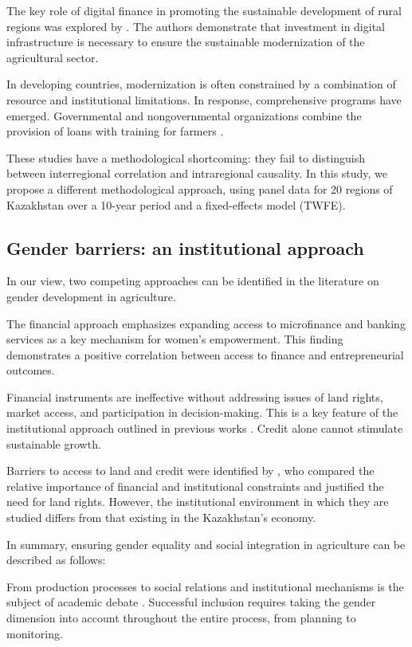 ﻿\documentclass[pdflatex,sn-mathphys-ay]{sn-jnl}
\begin{document}
The key role of digital finance in promoting the sustainable development
of rural regions was explored by \citet{ref87}.
The authors demonstrate that investment in digital infrastructure is
necessary to ensure the sustainable modernization of the agricultural
sector.

In developing countries, modernization is often constrained by a
combination of resource and institutional limitations. In response,
comprehensive programs have emerged. Governmental and nongovernmental
organizations combine the provision of loans with training for farmers
\citep{ref74,ref13,ref73}.

These studies have a methodological shortcoming: they fail to
distinguish between interregional correlation and intraregional
causality. In this study, we propose a different methodological
approach, using panel data for 20 regions of Kazakhstan over a 10-year
period and a fixed-effects model (TWFE).

\subsection{Gender barriers: an institutional approach}

In our view, two competing approaches can be identified in the
literature on gender development in agriculture.

The financial approach \citep{ref60,ref88} emphasizes expanding access to microfinance and banking
services as a key mechanism for women's empowerment. This finding demonstrates a
positive correlation between access to finance and entrepreneurial
outcomes.

Financial instruments are ineffective without addressing issues of land
rights, market access, and participation in decision-making. This is a
key feature of the institutional approach outlined in previous works
\citep{ref78,ref26,ref02,ref32,ref36,ref66}. Credit alone
cannot stimulate sustainable growth.

Barriers to access to land and credit were identified by
\citep{ref26,ref20,ref06}, who compared the
relative importance of financial and institutional constraints and
justified the need for land rights. However, the institutional
environment in which they are studied differs from that existing in the
Kazakhstan's economy.

In summary, ensuring gender equality and social integration in
agriculture can be described as follows:

From production processes to social relations and institutional
mechanisms is the subject of academic debate \citep{ref78,ref93,ref04}. Successful inclusion
requires taking the gender dimension into account throughout the entire
process, from planning to monitoring.
\end{document}
